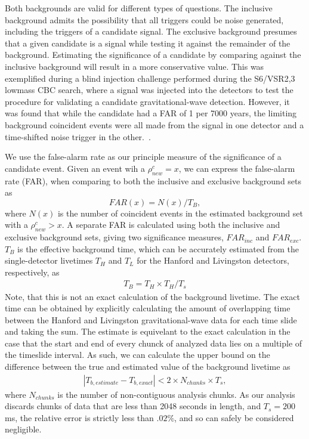 Both backgrounds are valid for different types of questions. The inclusive background admits the possibility that all triggers could be noise generated, including the triggers of a candidate signal. The exclusive background presumes that a given candidate is a signal while testing it against the remainder of the background. Estimating the significance of a candidate by comparing against the inclusive background will result in a more conservative value. This was exemplified during a blind injection challenge performed during the S6/VSR2,3 lowmass CBC search, where a signal was injected into the detectors to test the procedure for validating a candidate gravitational-wave detection. However, it was found that while the candidate had a FAR of 1 per 7000 years, the limiting background coincident events were all made from the signal in one detector and a time-shifted noise trigger in the other.~\cite{Abadie:2011nz}.

We use the false-alarm rate as our principle measure of the significance of a candidate event. Given an event wih a $\rho^c_{new}=x$, we can express the false-alarm rate (FAR), when comparing to both the inclusive and exclusive background sets as
%
\begin{equation}
FAR (x) = N (x) / {T_B},
\end{equation}
%
where $N(x)$ is the number of coincident events in the estimated background set with a $\rho^c_{new} > x$. A separate FAR is calculated using both the inclusive and exclusive background sets, giving two significance measures, $FAR_{inc}$ and $FAR_{exc}$. $T_B$ is the effective background time, which can be accurately estimated from the single-detector livetimes $T_H$ and $T_L$ for the Hanford and Livingston detectors, respectively, as
%
\begin{eqnarray}
T_B =  T_H \times T_H / T_s
\end{eqnarray}
%
Note, that this is not an exact calculation of the background livetime. The exact time can be obtained by explicitly calculating the amount of overlapping time between the Hanford and Livingston gravitational-wave data for each time slide and taking the sum. The estimate is equivelant to the exact calculation in the case that the start and end of every chunck of analyzed data lies on a multiple of the timeslide interval. As such, we can calculate the upper bound on the difference between the true and estimated value of the background livetime as
%
\begin{eqnarray}
|T_{b, estimate} - T_{b, exact} |< 2 \times N_{chunks} \times T_s,
\end{eqnarray}
%
where $N_{chunks}$ is the number of non-contiguous analysis chunks. As our analysis discards chunks of data that are less than 2048 seconds in length, and  $T_s=200$ ms, the relative error is strictly less than $.02\%$, and so can safely be considered negligible.

